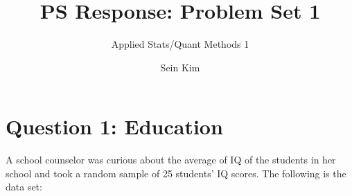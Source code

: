 \documentclass[12pt,letterpaper]{article}
\title{PS Response: Problem Set 1}
\date{Sein Kim}
\author{Applied Stats/Quant Methods 1}
\begin{document}
		\maketitle
	
		\vspace{1cm}
\section*{Question 1: Education}
	
				A school counselor was curious about the average of IQ of the students in her school and took a random sample of 25 students' IQ scores. The following is the data set:\\
				\vspace{.5cm}
				
				  
				
				\vspace{1cm}
				
\end{document}
